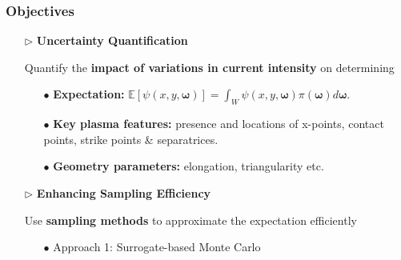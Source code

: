 \documentclass{beamer}
\begin{document}
\begin{frame}[t]
    \frametitle{Objectives}
        \begin{itemize}[leftmargin=5pt] 
            
            \item[$\triangleright$] \textcolor{myblue3}{\bf Uncertainty Quantification} 
            
            {\fontsize{9}{9}\selectfont
            Quantify the {\bf impact of variations in current intensity} on determining 
            \begin{itemize}[leftmargin=15pt]     
                \item[\textcolor{myblue3}{$\bullet$}]   {\bf Expectation:}
                $\mathbb{E}\left[\psi(x,y,\boldsymbol \omega)\right]=\int_W \psi(x,y,\boldsymbol{\omega})\pi(\boldsymbol\omega)d\boldsymbol{\omega}.$
            
                \vspace{0.5mm}
                \item[\textcolor{myblue3}{$\bullet$}] {\bf Key plasma features:}  presence and locations of x-points, contact points, strike points \& separatrices.

                \vspace{0.5mm}
                \item[\textcolor{myblue3}{$\bullet$}]  {\bf Geometry parameters:} elongation, triangularity etc.
                
            \end{itemize}
            }
            \vspace{2mm}
            \item[$\triangleright$] \textcolor{myblue3}{\bf Enhancing Sampling Efficiency}
            
            {\fontsize{9}{9}\selectfont
            Use {\bf sampling methods} to approximate the expectation efficiently
            \begin{itemize}[leftmargin=15pt] 
                \vspace{2mm}
                \item[\textcolor{myblue3}{$\bullet$}] \textcolor{myblue3}{Approach 1: Surrogate-based Monte Carlo}
                

\end{itemize}}
\end{itemize}
\end{frame}
\end{document}
